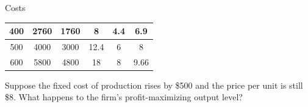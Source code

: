 \documentclass{beamer}
\begin{document}
\begin{frame}[t]{Costs}
\begin{table}[H]
\begin{tabular}{cccccc}
    400      & 2760                                                  & 1760                                                    & 8                                                        & 4.4                                                              & 6.9                                                           \\ \hline
    500      & 4000                                                  & 3000                                                    & 12.4                                                     & 6                                                                & 8                                                             \\ \hline
    600      & 5800                                                  & 4800                                                    & 18                                                       & 8                                                                & 9.66                                                         
    \end{tabular}
    \end{table}
    Suppose the fixed cost of production rises by \$500 and the price per unit is still \$8. What happens to the firm's profit-maximizing output level?
\end{frame}
\end{document}
